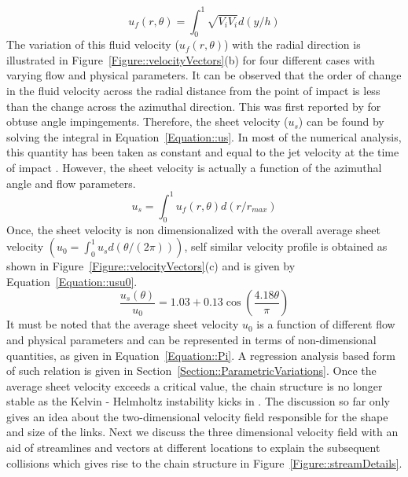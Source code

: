 \documentclass[%
aip,
sd,%
amsmath,amssymb,
preprint,%
author-year,%
]{revtex4-1}
\begin{document}
\begin{equation}\label{Equation::uf}
u_f(r,\theta) = \int_{0}^{1}\sqrt{V_iV_i}d(y/h)
\end{equation}
The variation of this fluid velocity ($u_f(r,\theta)$) with the radial direction is illustrated in Figure~\ref{Figure::velocityVectors}(b) for four different cases with varying flow and physical parameters. It can be observed that the order of change in the fluid velocity across the radial distance from the point of impact is less than the change across the azimuthal direction. This was first reported by \cite{choo2002velocity} for obtuse angle impingements. Therefore, the sheet velocity ($u_s$) can be found by solving the integral in Equation~\ref{Equation::us}. In most of the numerical analysis, this quantity has been taken as constant and equal to the jet velocity at the time of impact \citep{bush2004collision,bremond2006atomization,hasson1964thickness}. However, the sheet velocity is actually a function of the azimuthal angle and flow parameters. 
\begin{equation}\label{Equation::us}
u_s = \int_{0}^{1}u_f(r,\theta)d(r/r_{max})
\end{equation}   
Once, the sheet velocity is non dimensionalized with the overall average sheet velocity $\left(u_0 = \int_{0}^{1}u_sd(\theta/(2\pi))\right)$, self similar velocity profile is obtained as shown in Figure~\ref{Figure::velocityVectors}(c) and is given by Equation~\ref{Equation::usu0}.
\begin{equation}\label{Equation::usu0}
\frac{u_s(\theta)}{u_0} = 1.03 + 0.13\cos\left(\frac{4.18\theta}{\pi}\right)
\end{equation}
It must be noted that the average sheet velocity $u_0$ is a function of different flow and physical parameters and can be represented in terms of non-dimensional quantities, as given in Equation~\ref{Equation::Pi}. A regression analysis based form of such relation is given in Section~\ref{Section::ParametricVariations}. Once the average sheet velocity exceeds a critical value, the chain structure is no longer stable as the  Kelvin - Helmholtz instability kicks in \citep{villermaux2002life}. The discussion so far only gives an idea about the two-dimensional velocity field responsible for the shape and size of the links. Next we discuss the three dimensional velocity field with an aid of streamlines and vectors at different locations to explain the subsequent collisions which gives rise to the chain structure in Figure~\ref{Figure::streamDetails}.
\end{document}
